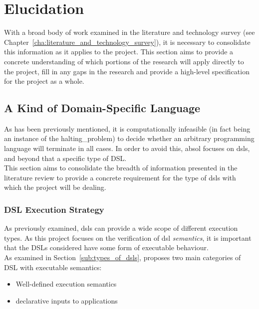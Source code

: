 \chapter{Elucidation} %
\label{cha:elucidation}
With a broad body of work examined in the literature and technology survey (see Chapter~\ref{cha:literature_and_technology_survey}), it is necessary to consolidate this information as it applies to the project. 
This section aims to provide a concrete understanding of which portions of the research will apply directly to the project, fill in any gaps in the research and provide a high-level specification for the project as a whole.

\section{A Kind of Domain-Specific Language} %
\label{sec:a_kind_of_domain_specific_language}
As has been previously mentioned, it is computationally infeasible (in fact being an instance of the \gls{halting_problem}) to decide whether an arbitrary programming language will terminate in all cases. 
In order to avoid this, \gls{absol} focuses on \glspl{dsl}, and beyond that a specific type of DSL. \\

This section aims to consolidate the breadth of information presented in the literature review to provide a concrete requirement for the type of \glspl{dsl} with which the project will be dealing. 

\subsection{DSL Execution Strategy} %
\label{sub:dsl_execution_strategy}
As previously examined, \glspl{dsl} can provide a wide scope of different execution types. 
As this project focuses on the verification of \gls{dsl} \textit{semantics}, it is important that the DSLs considered have some form of executable behaviour. \\

As examined in Section~\ref{sub:types_of_dsls}, \citet{Mernik:2005:DDL:1118890.1118892} proposes two main categories of DSL with executable semantics:
\begin{itemize}
    \item Well-defined execution semantics
    \item \Gls{declarative} inputs to applications
\end{itemize}

